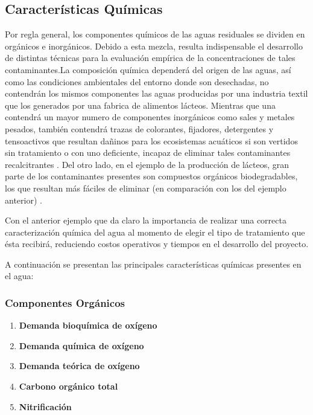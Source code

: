 \subsection{Características Químicas}
Por regla general, los componentes químicos de las aguas residuales se dividen en orgánicos e inorgánicos.  Debido a esta mezcla, resulta indispensable el desarrollo de distintas técnicas para la evaluación empírica de la concentraciones de tales contaminantes.La composición química dependerá del origen de las aguas, así como las condiciones ambientales del entorno donde son desechadas, no contendrán los mismos componentes las aguas producidas por una industria textil que los generados por una fabrica de alimentos lácteos. Mientras que una contendrá un mayor numero de componentes inorgánicos como sales y metales pesados, también contendrá trazas de colorantes, fijadores, detergentes y tensoactivos que resultan dañinos para los ecosistemas acuáticos si son vertidos sin tratamiento o con uno deficiente, incapaz de  eliminar tales contaminantes recalcitrantes \citep{Fabregas2021}. Del otro lado, en el ejemplo de la producción de lácteos, gran parte de los contaminantes presentes son compuestos orgánicos biodegradables, los que resultan más fáciles de eliminar (en comparación con los del ejemplo anterior) \citep{RodriguezGuerra2020}.\par
Con el anterior ejemplo que da claro la importancia de realizar una correcta caracterización química del agua al momento de elegir el tipo de tratamiento que ésta recibirá, reduciendo costos operativos y tiempos en el desarrollo del proyecto.\par
A continuación se presentan las principales características químicas presentes en el agua: \par
\subsubsection{Componentes Orgánicos}
\begin{enumerate}[label=\textbf{\alph*{.-}}]
	\item \textbf{Demanda bioquímica de oxígeno}\par
	
	\item \textbf{Demanda química de oxígeno}\par
	
	\item \textbf{Demanda teórica de oxígeno}\par
	
	\item \textbf{Carbono orgánico total}\par
	
	\item \textbf{Nitrificación}\par
	
\end{enumerate}
